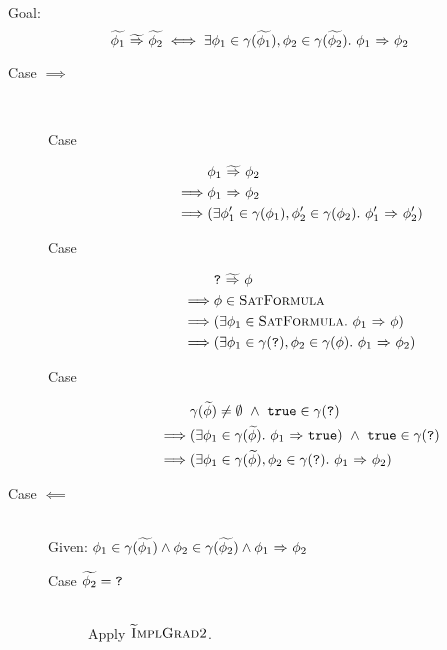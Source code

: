 \begin{proofatend}~\\
    Goal:
    $${\widetilde{\phi_1}} \,\,{\widetilde{\Rightarrow}}\,\, {\widetilde{\phi_2}} \iff \exists \phi_1 \in \gamma(\widetilde{\phi_1}), \phi_2 \in \gamma(\widetilde{\phi_2}).~ {\phi_1} \,\,{\Rightarrow}\,\, {\phi_2}$$
    
    \begin{description}
        \item[Case $\implies$]~\\
        \begin{description}
            \item[Case ]
            \begin{align*}
            &{\phi_1} \,\,{\widetilde{\Rightarrow}}\,\, {\phi_2}\\
            \implies
            &{\phi_1} \,\,{\Rightarrow}\,\, {\phi_2}\\
            \implies
            &(\exists \phi_1' \in \gamma(\phi_1), \phi_2' \in \gamma(\phi_2).~ {\phi_1'} \,\,{\Rightarrow}\,\, {\phi_2'})
            \end{align*}
            
            \item[Case ]
            \begin{align*}
            &{\textup{\texttt{?}}} \,\,{\widetilde{\Rightarrow}}\,\, {\phi}\\
            \implies
            &\phi \in \textup{\textsc{SatFormula}}\\
            \implies
            &(\exists \phi_1 \in \textup{\textsc{SatFormula}}.~ {\phi_1} \,\,{\Rightarrow}\,\, {\phi})\\
            \implies
            &(\exists \phi_1 \in \gamma(\textup{\texttt{?}}), \phi_2 \in \gamma(\phi).~ {\phi_1} \,\,{\Rightarrow}\,\, {\phi_2})
            \end{align*}
            
            \item[Case ]
            \begin{align*}
            &\gamma(\widetilde{\phi}) \neq \emptyset ~\wedge~ \textup{\texttt{true}} \in \gamma(\textup{\texttt{?}})\\
            \implies
            &(\exists \phi_1 \in \gamma(\widetilde{\phi}).~ {\phi_1} \,\,{\Rightarrow}\,\, {\textup{\texttt{true}}}) ~\wedge~ \textup{\texttt{true}} \in \gamma(\textup{\texttt{?}})\\
            \implies
            &(\exists \phi_1 \in \gamma(\widetilde{\phi}), \phi_2 \in \gamma(\textup{\texttt{?}}).~ {\phi_1} \,\,{\Rightarrow}\,\, {\phi_2})
            \end{align*}
        \end{description}
        \item[Case $\impliedby$]~\\
        Given: $\phi_1 \in \gamma(\widetilde{\phi_1}) \wedge \phi_2 \in \gamma(\widetilde{\phi_2}) \wedge {\phi_1} \,\,{\Rightarrow}\,\, {\phi_2}$
        \begin{description}
            \item[Case $\widetilde{\phi_2} = \textup{\texttt{?}}$]~\\
            Apply $\textup{\textsc{\ensuremath{\widetilde{\text{I}}}mplGrad2}}$.
            

\end{description}
\end{description}
\end{proofatend}
